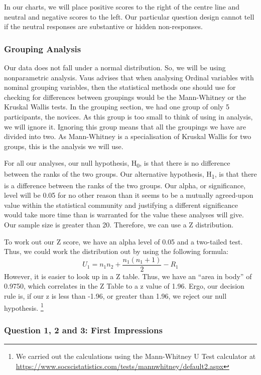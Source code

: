 In our charts, we will place positive scores to the right of the centre line and neutral and negative scores to the left.
Our particular question design cannot tell if the neutral responses are substantive or hidden non-responses\cite{blasius2001use}.

\subsubsection{Grouping Analysis}
Our data does not fall under a normal distribution. 
So, we will be using nonparametric analysis.
Vaus\cite{de2013surveys} advises that when analysing Ordinal variables with nominal grouping variables, then the statistical methods one should use for checking for differences between groupings would be the Mann-Whitney\cite{mann1947test} or the Kruskal Wallis\cite{kruskal1952use} tests.
In the grouping section, we had one group of only 5 participants, the novices.
As this group is too small to think of using in analysis, we will ignore it.
Ignoring this group means that all the groupings we have are divided into two.
As Mann-Whitney is a specialisation of Kruskal Wallis for two groups, this is the analysis we will use.

For all our analyses, our null hypothesis, H\textsubscript{0}, is that there is no difference between the ranks of the two groups. 
Our alternative hypothesis, H\textsubscript{1}, is that there is a difference between the ranks of the two groups.
Our alpha, or significance, level will be 0.05 for no other reason than it seems to be a mutually agreed-upon value within the statistical community and justifying a different significance would take more time than is warranted for the value these analyses will give.
Our sample size is greater than 20. 
Therefore, we can use a Z distribution.

To work out our Z score, we have an alpha level of 0.05 and a two-tailed test.
Thus, we could work the distribution out by using the following formula:
\[U_{1}=n_{1}n_{2}+\frac{n_{1}(n_{1}+1)}{2}-R_{1}\]
However, it is easier to look up in a Z table.
Thus, we have an ``area in body'' of 0.9750, which correlates in the Z Table to a z value of 1.96.
Ergo, our decision rule is, if our z is less than -1.96, or greater than 1.96, we reject our null hypothesis.
\footnote{We carried out the calculations using the Mann-Whitney U Test calculator at \url{https://www.socscistatistics.com/tests/mannwhitney/default2.aspx}}

\subsubsection{Question 1, 2 and 3: First Impressions}

